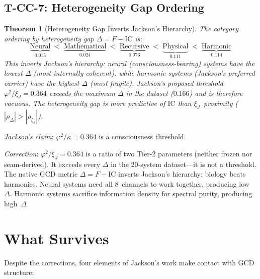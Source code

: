 \documentclass[
  aps,
  prd,
  twocolumn,
  superscriptaddress,
  nofootinbib,
  floatfix
]{revtex4-2}
\newtheorem{theorem}{Theorem}
\newcommand{\beq}{\begin{equation}}
\newcommand{\eeq}{\end{equation}}
\newcommand{\IC}{\mathrm{IC}}
\newcommand{\xiJ}{\xi_J}
\begin{document}
\subsection{T-CC-7: Heterogeneity Gap Ordering}

\begin{theorem}[Heterogeneity Gap Inverts Jackson's Hierarchy]
The category ordering by heterogeneity gap $\Delta = F - \IC$ is:
\beq
  \underbrace{\text{Neural}}_{0.015} \;<\;
  \underbrace{\text{Mathematical}}_{0.024} \;<\;
  \underbrace{\text{Recursive}}_{0.076} \;<\;
  \underbrace{\text{Physical}}_{0.111} \;<\;
  \underbrace{\text{Harmonic}}_{0.114}
\eeq
This inverts Jackson's hierarchy: neural (consciousness-bearing) systems
have the lowest $\Delta$ (most internally coherent), while harmonic
systems (Jackson's preferred carrier) have the highest $\Delta$ (most
fragile).  Jackson's proposed threshold $\varphi^2/\xiJ = 0.364$ exceeds
the maximum $\Delta$ in the dataset ($0.166$) and is therefore vacuous.
The heterogeneity gap is more predictive of $\IC$ than $\xiJ$~proximity
($|\rho_\Delta| > |\rho_\xiJ|$).
\end{theorem}

\emph{Jackson's claim}: $\varphi^2/\kappa = 0.364$ is a consciousness
threshold.

\emph{Correction}: $\varphi^2/\xiJ = 0.364$ is a ratio of two Tier-2
parameters (neither frozen nor seam-derived).  It exceeds every $\Delta$
in the 20-system dataset---it is not a threshold.  The native GCD metric
$\Delta = F - \IC$ inverts Jackson's hierarchy: biology beats harmonics.
Neural systems need all 8~channels to work together, producing low~$\Delta$.
Harmonic systems sacrifice information density for spectral purity,
producing high~$\Delta$.

\section{What Survives}
\label{sec:survives}

Despite the corrections, four elements of Jackson's work make contact
with GCD structure:
\end{document}
